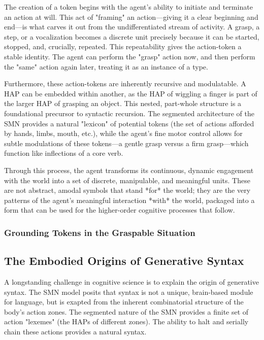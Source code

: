 The creation of a token begins with the agent's ability to initiate and terminate an action at will. This act of "framing" an action—giving it a clear beginning and end—is what carves it out from the undifferentiated stream of activity. A grasp, a step, or a vocalization becomes a discrete unit precisely because it can be started, stopped, and, crucially, repeated. This repeatability gives the action-token a stable identity. The agent can perform the "grasp" action now, and then perform the "same" action again later, treating it as an instance of a type.

Furthermore, these action-tokens are inherently recursive and modulatable. A HAP can be embedded within another, as the HAP of wiggling a finger is part of the larger HAP of grasping an object. This nested, part-whole structure is a foundational precursor to syntactic recursion. The segmented architecture of the SMN provides a natural "lexicon" of potential tokens (the set of actions afforded by hands, limbs, mouth, etc.), while the agent's fine motor control allows for subtle modulations of these tokens—a gentle grasp versus a firm grasp—which function like inflections of a core verb.

Through this process, the agent transforms its continuous, dynamic engagement with the world into a set of discrete, manipulable, and meaningful units. These are not abstract, amodal symbols that stand *for* the world; they are the very patterns of the agent's meaningful interaction *with* the world, packaged into a form that can be used for the higher-order cognitive processes that follow.

\subsubsection*{Grounding Tokens in the Graspable Situation}

\subsection*{The Embodied Origins of Generative Syntax}
A longstanding challenge in cognitive science is to explain the origin of generative syntax. The SMN model posits that syntax is not a unique, brain-based module for language, but is exapted from the inherent combinatorial structure of the body's action zones. The segmented nature of the SMN provides a finite set of action "lexemes" (the HAPs of different zones). The ability to halt and serially chain these actions provides a natural syntax. 

